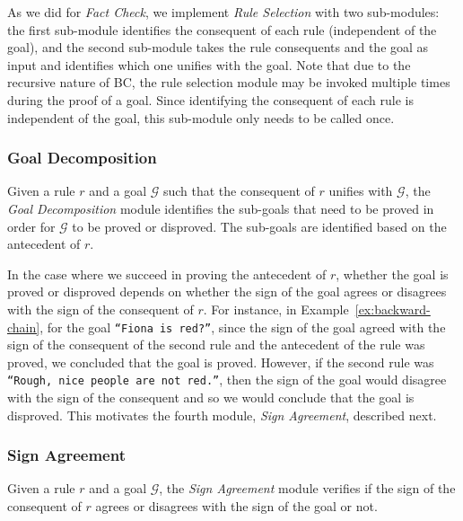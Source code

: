 \documentclass[11pt]{article}
\newcommand{\goal}[1]{\ensuremath{\mathcal{#1}}}
\newcommand{\module}[1]{\emph{#1}}
\begin{document}
As we did for \module{Fact Check}, we implement \module{Rule Selection} with two sub-modules: the first sub-module identifies the consequent of each rule (independent of the goal), and the second sub-module takes the rule consequents and the goal as input and identifies which one unifies with the goal. 
Note that due to the recursive nature of BC, the rule selection module may be invoked multiple times during the proof of a goal. Since identifying the consequent of each rule is independent of the goal, this sub-module only needs to be called once.

\subsubsection{Goal Decomposition}
Given a rule $r$ and a goal \goal{G} such that the consequent of $r$ unifies with \goal{G}, the \module{Goal Decomposition} module identifies the sub-goals that need to be proved in order for $\goal{G}$ to be proved or disproved. The sub-goals are identified based on the antecedent of $r$.

In the case where we succeed in proving the antecedent of $r$, whether the goal is proved or disproved depends on whether the sign of the goal agrees or disagrees with the sign of the consequent of $r$. For instance, in Example~\ref{ex:backward-chain}, for the goal \texttt{``Fiona is red?''}, since the sign of the goal agreed with the sign of the consequent of the second rule and the antecedent of the rule was proved, we concluded that the goal is proved. However, if the second rule was \texttt{``Rough, nice people are not red.''}, then the sign of the goal would disagree with the sign of the consequent and so we would conclude that the goal is disproved. This motivates the fourth module, \module{Sign Agreement}, described next.

\subsubsection{Sign Agreement}
Given a rule $r$ and a goal \goal{G}, the \module{Sign Agreement} module verifies if the sign of the consequent of $r$ agrees or disagrees with the sign of the goal or not.
\end{document}
